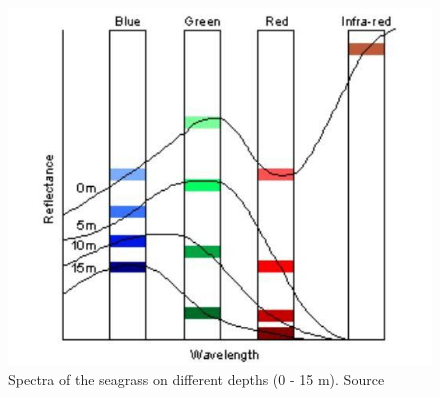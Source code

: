 \documentclass[11pt]{article}
\begin{document}
\begin{figure}
	\centering
	\includegraphics[scale=0.25]{Fig-1-9.jpg}
	\caption{Spectra of the seagrass on different depths (0 - 15 m). Source \cite{Edwards00}\label{Edwards00}}
	\label{fig:9}
\end{figure}
\end{document}

